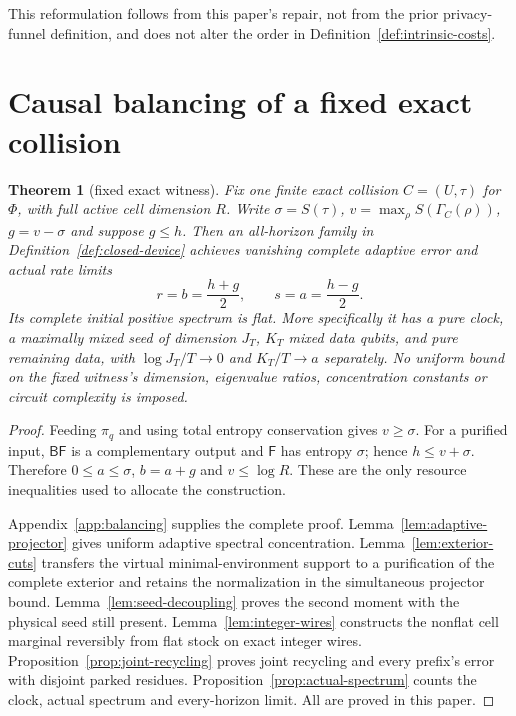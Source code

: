 \documentclass[11pt,a4paper]{article}
\numberwithin{equation}{section}
\theoremstyle{plain}
\newtheorem{theorem}{Theorem}[section]
\theoremstyle{definition}
\newcommand{\rg}[1]{\mathsf{#1}}
\begin{document}
This reformulation follows from this paper's repair, not from the prior
privacy-funnel definition, and does not alter the order in
Definition~\ref{def:intrinsic-costs}.


\section{Causal balancing of a fixed exact collision}
\label{sec:balancing}

\begin{theorem}[fixed exact witness]
\label{thm:causal-balancing}
Fix one finite exact collision $C=(U,\tau)$ for $\Phi$, with full active cell
dimension $R$. Write $\sigma=S(\tau)$, $v=\max_\rho S(\Gamma_C(\rho))$,
$g=v-\sigma$ and suppose $g\le h$. Then an all-horizon family in
Definition~\ref{def:closed-device} achieves vanishing complete adaptive error
and actual rate limits
\[
r=b=\frac{h+g}{2},\qquad s=a=\frac{h-g}{2}.
\]
Its complete initial positive spectrum is flat. More specifically it has a
pure clock, a maximally mixed seed of dimension $J_T$, $K_T$ mixed data
qubits, and pure remaining data, with $\log J_T/T\to 0$ and $K_T/T\to a$
separately. No uniform bound on the fixed witness's dimension, eigenvalue
ratios, concentration constants or circuit complexity is imposed.
\end{theorem}

\begin{proof}
Feeding $\pi_q$ and using total entropy conservation gives $v\ge\sigma$. For a
purified input, $\rg{B}\rg{F}$ is a complementary output and $\rg{F}$ has
entropy $\sigma$; hence $h\le v+\sigma$. Therefore $0\le a\le\sigma$, $b=a+g$
and $v\le\log R$. These are the only resource inequalities used to allocate
the construction.

Appendix~\ref{app:balancing} supplies the complete proof.
Lemma~\ref{lem:adaptive-projector} gives uniform adaptive spectral
concentration. Lemma~\ref{lem:exterior-cuts} transfers the virtual
minimal-environment support to a purification of the complete exterior and
retains the normalization in the simultaneous projector bound.
Lemma~\ref{lem:seed-decoupling} proves the second moment with the physical
seed still present. Lemma~\ref{lem:integer-wires} constructs the nonflat cell
marginal reversibly from flat stock on exact integer wires.
Proposition~\ref{prop:joint-recycling} proves joint recycling and every
prefix's error with disjoint parked residues.
Proposition~\ref{prop:actual-spectrum} counts the clock, actual spectrum and
every-horizon limit. All are proved in this paper.
\end{proof}
\end{document}
